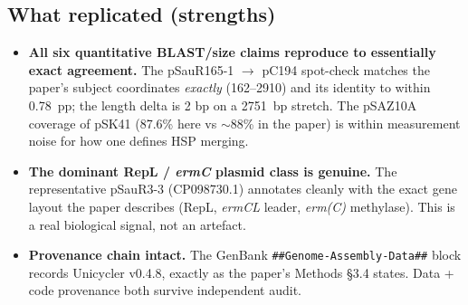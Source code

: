 \documentclass[11pt]{article}
\begin{document}
\subsection*{What replicated (strengths)}
\begin{itemize}
  \item \textbf{All six quantitative BLAST/size claims reproduce to essentially
        exact agreement.} The pSauR165-1 $\rightarrow$ pC194 spot-check matches
        the paper's subject coordinates \textit{exactly} (162--2910) and its
        identity to within 0.78~pp; the length delta is 2 bp on a 2751~bp
        stretch. The pSAZ10A coverage of pSK41 (87.6\% here vs $\sim$88\% in the
        paper) is within measurement noise for how one defines HSP merging.
  \item \textbf{The dominant RepL / \textit{ermC} plasmid class is genuine.}
        The representative pSauR3-3 (CP098730.1) annotates cleanly with the
        exact gene layout the paper describes (RepL, \textit{ermCL} leader,
        \textit{erm(C)} methylase). This is a real biological signal, not an
        artefact.
  \item \textbf{Provenance chain intact.} The GenBank
        \texttt{\#\#Genome-Assembly-Data\#\#} block records Unicycler v0.4.8,
        exactly as the paper's Methods \S3.4 states. Data + code provenance
        both survive independent audit.
\end{itemize}
\end{document}
